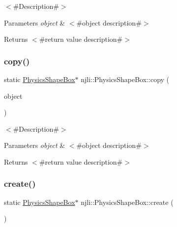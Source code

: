$<$\#\+Description\#$>$


\begin{DoxyParams}{Parameters}
{\em object} & $<$\#object description\#$>$\\
\hline
\end{DoxyParams}
\begin{DoxyReturn}{Returns}
$<$\#return value description\#$>$ 
\end{DoxyReturn}
\mbox{\label{classnjli_1_1_physics_shape_box_a53c86d86b8d75802aedcf6bc187d7775}} 
\subsubsection{\texorpdfstring{copy()}{copy()}}
{\footnotesize\ttfamily static \mbox{\hyperlink{classnjli_1_1_physics_shape_box}{Physics\+Shape\+Box}}$\ast$ njli\+::\+Physics\+Shape\+Box\+::copy (\begin{DoxyParamCaption}\item[{const \mbox{\hyperlink{classnjli_1_1_physics_shape_box}{Physics\+Shape\+Box}} \&}]{object }\end{DoxyParamCaption})\hspace{0.3cm}{\ttfamily [static]}}

$<$\#\+Description\#$>$


\begin{DoxyParams}{Parameters}
{\em object} & $<$\#object description\#$>$\\
\hline
\end{DoxyParams}
\begin{DoxyReturn}{Returns}
$<$\#return value description\#$>$ 
\end{DoxyReturn}
\mbox{\label{classnjli_1_1_physics_shape_box_acc8fc5e187407dd0f03767fd19d82de2}} 
\subsubsection{\texorpdfstring{create()}{create()}\hspace{0.1cm}{\footnotesize\ttfamily [1/2]}}
{\footnotesize\ttfamily static \mbox{\hyperlink{classnjli_1_1_physics_shape_box}{Physics\+Shape\+Box}}$\ast$ njli\+::\+Physics\+Shape\+Box\+::create (\begin{DoxyParamCaption}{ }\end{DoxyParamCaption})\hspace{0.3cm}{\ttfamily [static]}}


